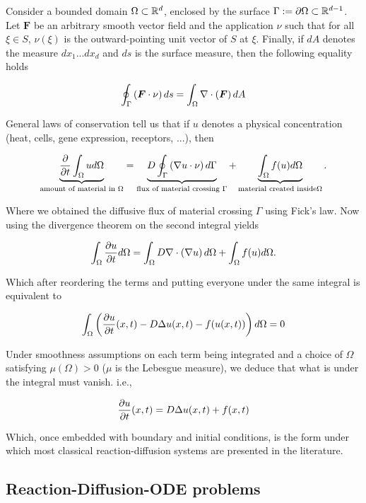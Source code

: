 \begin{theorem}
	Consider a bounded domain $\Omega \subset \mathbb{R}^d$, enclosed by the surface $\Gamma := \partial \Omega \subset \mathbb{R}^{d-1}$. Let $\bm F$ be an arbitrary smooth vector field and the application $\nu$ such that for all $\xi \in S$, $\nu(\xi)$ is the outward-pointing unit vector of $S$ at $\xi$. Finally, if $dA$ denotes the measure $d x_1 ... d x_d$ and $ds$ is the surface measure, then the following equality holds
	
	$$\oint_\Gamma \left( \bm F \cdot \nu \right) ds = \int_\Omega \nabla \cdot \left( \bm F\right) d A$$
\end{theorem}

General laws of conservation tell us that if $u$ denotes a physical concentration (heat, cells, gene expression, receptors, ...), then

$$\underbrace{\frac{\partial}{\partial t} \int_{\Omega} u d\Omega}_{\text{amount of material in } \Omega} =  \underbrace{D \oint_\Gamma \left( \nabla u \cdot \nu \right) d\Gamma}_{\text{flux of material crossing } \Gamma} + \underbrace{\int_\Omega f(u) d\Omega}_{\text{material created inside} \Omega}.$$

Where we obtained the diffusive flux of material crossing $\Gamma$ using Fick's law. Now using the divergence theorem on the second integral yields

$$\int_{\Omega} \frac{\partial u}{\partial t} d\Omega =  \int_\Omega D \nabla \cdot \left( \nabla u \right) d\Omega + \int_\Omega f(u) d\Omega.$$

Which after reordering the terms and putting everyone under the same integral is equivalent to

$$\int_\Omega \left( \frac{\partial u}{\partial t}(x, t) - D \Delta u (x, t) - f(u(x, t)) \right) d\Omega = 0$$

Under smoothness assumptions on each term being integrated and a choice of $\Omega$ satisfying $\mu(\Omega) > 0$ ($\mu$ is the Lebesgue measure), we deduce that what is under the integral must vanish. i.e., 

\begin{equation}\label{rdeq} \frac{\partial u }{\partial t}(x, t) = D \Delta u(x, t) + f(x, t)\end{equation}

Which, once embedded with boundary and initial conditions, is the form under which most classical reaction-diffusion systems are presented in the literature.

\subsection{Reaction-Diffusion-ODE problems}

